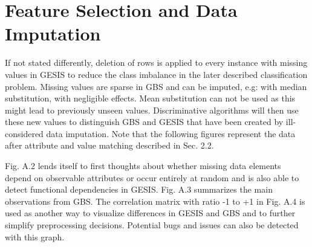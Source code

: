 \section{Feature Selection and Data Imputation}

If not stated differently, deletion of rows is applied to every instance with missing values in GESIS to reduce the class imbalance in the later described classification problem. Missing values are sparse in GBS and can be imputed, e.g: with median substitution, with negligible effects. Mean substitution can not be used as this might lead to previously unseen values. Discriminative algorithms will then use these new values to distinguish GBS and GESIS that have been created by ill-considered data imputation. Note that the following figures represent the data after attribute and value matching described in Sec. 2.2.

Fig. A.2 lends itself to first thoughts about whether missing data elements depend on observable attributes or occur entirely at random and is also able to detect functional dependencies in GESIS. Fig. A.3 summarizes the main observations from GBS. The correlation matrix with ratio -1 to +1 in Fig. A.4 is used as another way to visualize differences in GESIS and GBS and to further simplify preprocessing decisions. Potential bugs and issues can also be detected with this graph. 

